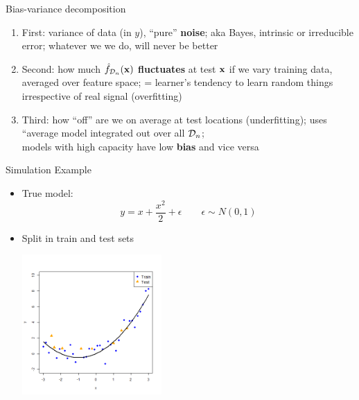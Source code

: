 \documentclass[11pt,compress,t,notes=noshow, xcolor=table]{beamer}
\begin{document}
\begin{vbframe} {Bias-variance decomposition}
\begin{enumerate}
  \item First: variance of data (in $y$), ``pure''
     \textbf{noise}; aka Bayes, intrinsic or irreducible error; 
    whatever we we do, will never be better
  \item Second: how much \textbf{$\hat{f}_{\mathcal{D}_n}(\mathbf{x})$ fluctuates} at test $\mathbf{x}$ if we vary training data, averaged over feature space; = learner's tendency to learn random things irrespective of real signal (overfitting)
  
  \item Third: how ``off'' are we on average at test locations (underfitting); uses ``average model integrated out over all $\mathcal{D}_n$; \\
  models with high capacity have low \textbf{bias} and vice versa
\end{enumerate}


\end{vbframe} 

\begin{vbframe} {Simulation Example}

\begin{itemize}
\item True model:
$$y = x + \frac{x^2}{2} + \epsilon  \qquad \epsilon \sim 
N (0, 1)$$
\item Split in train and test sets 
\begin{center}
  \includegraphics[width = 0.42\textwidth]{figure/bias_variance_decomposition-train_test.png}
\end{center}

\end{itemize}

\end{vbframe} 
\end{document}
